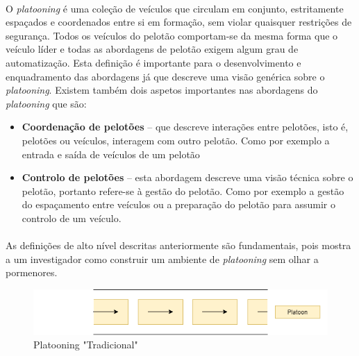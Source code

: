 \paragraph{}
O \textit{platooning} é uma coleção de veículos que circulam em conjunto, estritamente espaçados e coordenados entre si em formação, sem violar quaisquer restrições de segurança. Todos os veículos  do pelotão comportam-se da mesma forma que o veículo líder e todas as abordagens de pelotão exigem algum grau de automatização. Esta definição é importante para o desenvolvimento e enquadramento das abordagens já que descreve uma visão genérica sobre o \textit{platooning}.\vspace{5mm} 
Existem também dois aspetos importantes nas abordagens do  \textit{platooning} que são:
\begin{itemize}
\item \textbf{Coordenação de pelotões} – que descreve interações entre pelotões, isto é, pelotões ou veículos, interagem com outro pelotão. Como por exemplo a entrada e saída de veículos de um pelotão
\item \textbf{Controlo de pelotões} – esta abordagem descreve uma visão técnica sobre o pelotão, portanto refere-se à gestão do pelotão. Como por exemplo a gestão do espaçamento entre veículos ou a preparação do pelotão para assumir o controlo de um veículo. 
\end{itemize}
\paragraph{}
As definições de alto nível descritas anteriormente são fundamentais, pois mostra a um investigador  como construir um ambiente de \textit{platooning} sem olhar a pormenores.


\begin{figure}[H]
    \centering
    \includegraphics[scale=0.4]{LEI - Article/Images/platooning_trad.png}
    \caption{Platooning "Tradicional"}
    \label{fig:my_label}
\end{figure}